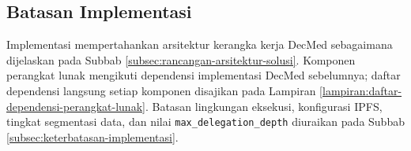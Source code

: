 \subsection{Batasan Implementasi}
\label{subsec:batasan-implementasi}

Implementasi mempertahankan arsitektur kerangka kerja DecMed sebagaimana dijelaskan pada Subbab \ref{subsec:rancangan-arsitektur-solusi}. Komponen perangkat lunak mengikuti dependensi implementasi DecMed sebelumnya; daftar dependensi langsung setiap komponen disajikan pada Lampiran \ref{lampiran:daftar-dependensi-perangkat-lunak}. Batasan lingkungan eksekusi, konfigurasi IPFS, tingkat segmentasi data, dan nilai \texttt{max\_delegation\_depth} diuraikan pada Subbab \ref{subsec:keterbatasan-implementasi}.